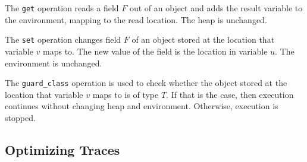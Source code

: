 \documentclass{sigplanconf}
\begin{document}
The \texttt{get} operation reads a field $F$ out of an object and adds the result
variable to the environment, mapping to the read location. The heap is
unchanged.

The \texttt{set} operation changes field $F$ of an object stored at the location that
variable $v$ maps to. The new value of the field is the location in variable
$u$. The environment is unchanged.

The \texttt{guard\_class} operation is used to check whether the object stored at the location
that variable $v$ maps to is of type $T$. If that is the case, then execution
continues without changing heap and environment. Otherwise, execution is
stopped.

\subsection{Optimizing Traces}
\label{sub:formalopt}
\end{document}
